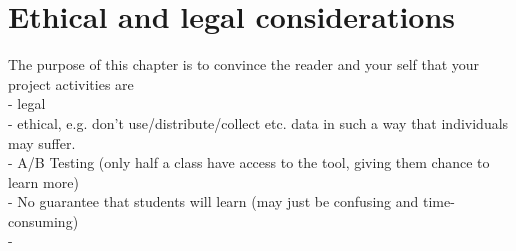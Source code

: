 \chapter{Ethical and legal considerations}
\label{chapter8:ethical_legeal_considerations}

The purpose of this chapter is to convince the reader and your self that your project activities are \\
- legal \\
- ethical, e.g. don’t use/distribute/collect etc. data in such a way that individuals may suffer. \\ 

- A/B Testing (only half a class have access to the tool, giving them chance to learn more) \\
- No guarantee that students will learn (may just be confusing and time-consuming) \\
- 